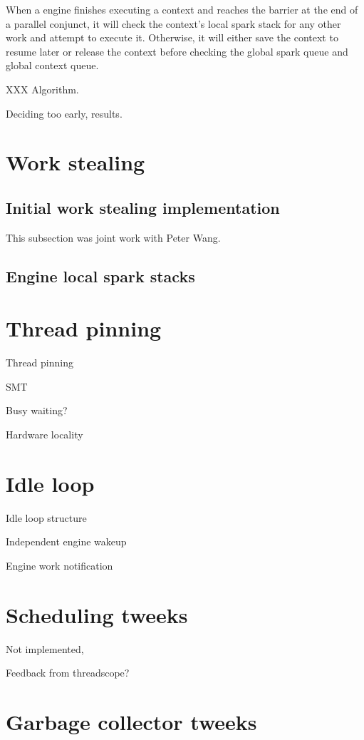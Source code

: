 When a engine finishes executing a context and reaches the barrier at the
end of a parallel conjunct,
it will check the context's local spark stack for any other work and attempt
to execute it.
Otherwise, it will either save the context to resume later or release the
context before checking the global spark queue and global context queue.

XXX Algorithm.

Deciding too early, results.


\section{Work stealing}

\subsection{Initial work stealing implementation}

This subsection was joint work with Peter Wang.

\subsection{Engine local spark stacks}

\section{Thread pinning}

Thread pinning

SMT

Busy waiting?

Hardware locality

\section{Idle loop}

Idle loop structure

Independent engine wakeup

Engine work notification

\section{Scheduling tweeks}

Not implemented,

Feedback from threadscope?

\section{Garbage collector tweeks}


